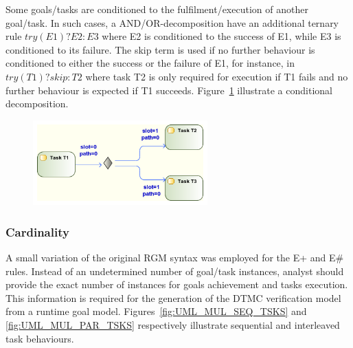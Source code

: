 Some goals/tasks are conditioned to the fulfilment/execution of another goal/task. In such cases, a AND/OR-decomposition have an additional ternary rule $try(E1)?E2:E3$ where E2 is conditioned to the success of E1, while E3 is conditioned to its failure. The skip term is used if no further behaviour is conditioned to either the success or the failure of E1, for instance, in $try(T1)?skip:T2$ where task T2 is only required for execution if T1 fails and no further behaviour is expected if T1 succeeds. Figure~\ref{fig:UML_TRY_TSKS} illustrate a conditional decomposition.

\begin{figure}[ht!]
\centering
\includegraphics[width=0.60\textwidth]{imgs/UML_TRY_TSKS.png}
\caption{}
\label{fig:UML_TRY_TSKS}
\end{figure}

\subsubsection{Cardinality}

A small variation of the original RGM syntax was employed for the E+ and E\# rules. Instead of an undetermined number of goal/task instances, analyst should provide the exact number of instances for goals achievement and tasks execution. This information is required for the generation of the DTMC verification model from a runtime goal model. Figures~\ref{fig:UML_MUL_SEQ_TSKS} and \ref{fig:UML_MUL_PAR_TSKS} respectively illustrate sequential and interleaved task behaviours.


